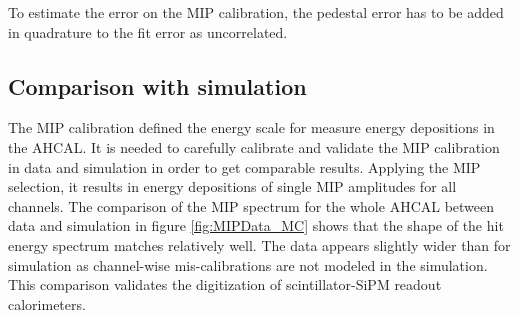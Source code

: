 To estimate the error on the MIP calibration, the pedestal error has to be added in quadrature to the fit error as uncorrelated.

\subsection{Comparison with simulation}

The MIP calibration defined the energy scale for measure energy depositions in the AHCAL. It is needed to carefully calibrate and validate the MIP calibration in data and simulation in order to get comparable results. Applying the MIP selection, it results in energy depositions of single MIP amplitudes for all channels. The comparison of the MIP spectrum for the whole AHCAL between data and simulation in figure \ref{fig:MIPData_MC} shows that the shape of the hit energy spectrum matches relatively well. The data appears slightly wider than for simulation as channel-wise mis-calibrations are not modeled in the simulation. This comparison validates the digitization of scintillator-SiPM readout calorimeters.

